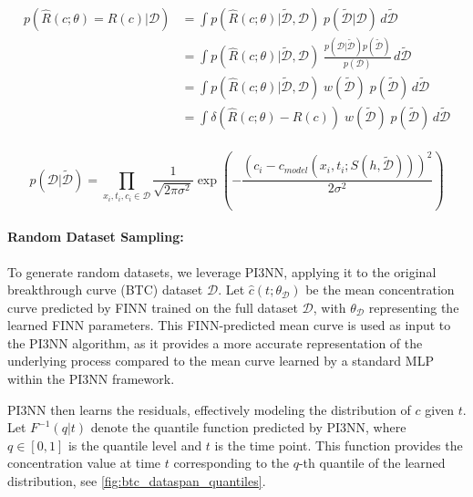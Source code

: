 \documentclass{article}
\begin{document}
\begin{align*}
    p(\hat{R}(c; \theta) = R(c)| \mathcal{D}) &= \int p(\hat{R}(c; \theta) | \tilde{\mathcal{D}}, \mathcal{D})\; p(\tilde{\mathcal{D}} | \mathcal{D}) \, d \tilde{\mathcal{D}} \\
                                              &= \int p(\hat{R}(c; \theta) | \tilde{\mathcal{D}}, \mathcal{D})\; \frac{p(\mathcal{D} | \tilde{\mathcal{D}}) p(\tilde{\mathcal{D}})}{p(\mathcal{D})} \, d \tilde{\mathcal{D}} \\
                                              &= \int p(\hat{R}(c; \theta) | \tilde{\mathcal{D}}, \mathcal{D})\; w(\tilde{\mathcal{D}})\; p(\tilde{\mathcal{D}}) \, d \tilde{\mathcal{D}} \\
                                              &= \int \delta(\hat{R}(c; \theta) - R(c))\; w(\tilde{\mathcal{D}})\; p(\tilde{\mathcal{D}}) \, d \tilde{\mathcal{D}} \\
\end{align*}

\begin{equation*}
    p(\mathcal{D} | \tilde{\mathcal{D}}) = \prod_{x_i, t_i, c_i \in \mathcal{D}} \frac{1}{\sqrt{2\pi \sigma^2}} \exp \left( -\frac{(c_i - c_{model}(x_i, t_i; S(h, \tilde{\mathcal{D}})))^2}{2\sigma^2} \right)
\end{equation*}

\paragraph{Random Dataset Sampling:}
\label{sec:random_dataset_sampling}
To generate random datasets, we leverage PI3NN, applying it to the original breakthrough curve (BTC) dataset $\mathcal{D}$. Let $\hat{c}(t; \theta_{\mathcal{D}})$ be the mean concentration curve predicted by FINN trained on the full dataset $\mathcal{D}$, with $\theta_{\mathcal{D}}$ representing the learned FINN parameters. This FINN-predicted mean curve is used as input to the PI3NN algorithm, as it provides a more accurate representation of the underlying process compared to the mean curve learned by a standard MLP within the PI3NN framework.

PI3NN then learns the residuals, effectively modeling the distribution of $c$ given $t$. Let $F^{-1}(q | t)$ denote the quantile function predicted by PI3NN, where $q \in [0, 1]$ is the quantile level and $t$ is the time point. This function provides the concentration value at time $t$ corresponding to the $q$-th quantile of the learned distribution, see \ref{fig:btc_dataspan_quantiles}.
\end{document}
